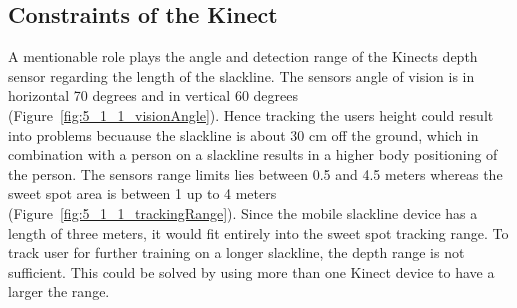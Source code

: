 \subsection{Constraints of the Kinect} 
A mentionable role plays the angle and detection range of the Kinects depth sensor regarding the length of the slackline. The sensors angle of vision is in horizontal 70 degrees and in vertical 60 degrees (Figure~\ref{fig:5_1_1_visionAngle}). Hence tracking the users height could result into problems becuause the slackline is about 30 cm off the ground, which in combination with a person on a slackline results in a higher body positioning of the person. The sensors range limits lies between 0.5 and 4.5 meters whereas the sweet spot area is between 1 up to 4 meters~\cite{MicrosoftHIG2014-mh} (Figure~\ref{fig:5_1_1_trackingRange}). Since the mobile slackline device has a length of three meters, it would fit entirely into the sweet spot tracking range. To track user for further training on a longer slackline, the depth range is not sufficient. This could be solved by using more than one Kinect device to have a larger the range. 
